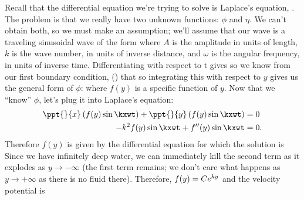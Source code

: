 \documentclass[12pt]{book}
\begin{document}
Recall that the differential equation  we're trying to solve is Laplace's equation, .  The problem is that we really have two unknown functions: $\phi$ and $\eta$.  We can't obtain both, so we must make an assumption; we'll assume that our  wave is a traveling sinusoidal wave of the form
where $A$ is the amplitude in units of length, $k$ is the wave number, in units of inverse distance, and $\omega$ is the angular frequency, in units of inverse time.  Differentiating  with respect to t gives
 so we know from our first boundary condition, () that
 so integrating this with respect to $y$ gives us the general form of $\phi$:
where $f(y)$ is a specific function of $y$.  Now that we ``know'' $\phi$, let's plug it into Laplace's equation:
\begin{align*}
\ppt{}{x}\left(   f(y)\sin\kxwt \right)  + \ppt{}{y}\left( f(y)\sin\kxwt\right)&=0\\
-k^2f(y)\sin\kxwt + f''(y)\sin\kxwt &= 0.
\end{align*}
Therefore $f(y)$ is given by the differential equation
for which the solution is
Since we have infinitely deep water, we can immediately kill the second term as it explodes as \mbox{$y\to-\infty$} (the first term remains; we don't care what happens as $y\to+\infty$ as there is no fluid there). Therefore, $f(y)=Ce^{ky}$ and the velocity potential is
\end{document}

